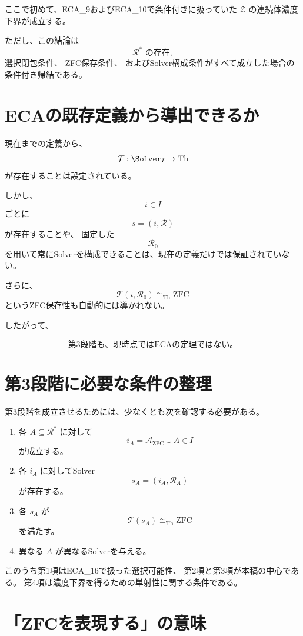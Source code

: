 \documentclass[11pt,a4paper]{article}
\begin{document}
ここで初めて、ECA\_9およびECA\_10で条件付きに扱っていた
$\mathcal Z$ の連続体濃度下界が成立する。

ただし、この結論は
\[
\mathcal R^*\text{ の存在},
\]
選択閉包条件、
ZFC保存条件、
およびSolver構成条件がすべて成立した場合の条件付き帰結である。

\section{ECAの既存定義から導出できるか}

現在までの定義から、
\[
\mathcal T:\Solver_I\to\mathrm{Th}
\]
が存在することは設定されている。

しかし、
\[
i\in I
\]
ごとに
\[
s=(i,\mathcal R)
\]
が存在することや、
固定した
\[
\mathcal R_0
\]
を用いて常にSolverを構成できることは、現在の定義だけでは保証されていない。

さらに、
\[
\mathcal T(i,\mathcal R_0)
\cong_{\mathrm{Th}}\mathrm{ZFC}
\]
というZFC保存性も自動的には導かれない。

したがって、

\[
\boxed{
\text{第3段階も、現時点ではECAの定理ではない。}
}
\]

\section{第3段階に必要な条件の整理}

第3段階を成立させるためには、少なくとも次を確認する必要がある。

\begin{enumerate}
    \item 各 $A\subseteq\mathcal R^*$ に対して
    \[
    i_A=\mathcal A_{\mathrm{ZFC}}\cup A\in I
    \]
    が成立する。

    \item 各 $i_A$ に対してSolver
    \[
    s_A=(i_A,\mathcal R_A)
    \]
    が存在する。

    \item 各 $s_A$ が
    \[
    \mathcal T(s_A)\cong_{\mathrm{Th}}\mathrm{ZFC}
    \]
    を満たす。

    \item 異なる $A$ が異なるSolverを与える。
\end{enumerate}

このうち第1項はECA\_16で扱った選択可能性、
第2項と第3項が本稿の中心である。
第4項は濃度下界を得るための単射性に関する条件である。

\section{「ZFCを表現する」の意味}
\end{document}
